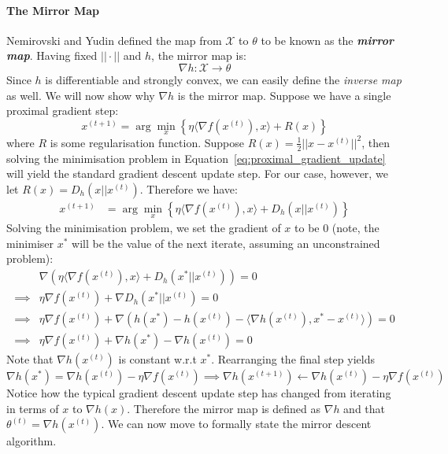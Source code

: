 \paragraph{The Mirror Map}
Nemirovski and Yudin defined the map from $\mathcal X$ to $\theta$ to be known as the \textbf{\textit{mirror map}}. Having fixed $||\cdot||$ and $h$, the mirror map is: \begin{equation}
    \nabla h: \mathcal X \to \theta
\end{equation} Since $h$ is differentiable and strongly convex, we can easily define the \textit{inverse map} as well. We will now show why $\nabla h$ is the mirror map. Suppose we have a single proximal gradient step:
\begin{equation}\label{eq:proximal_gradient_update}
    x^{(t+1)} = \arg \min_{x} \left\{\eta \langle \nabla f(x^{(t)}), x\rangle + R(x)\right\}
\end{equation} where $R$ is some regularisation function. Suppose $R(x) = \frac{1}{2}||x - x^{(t)}||^2$, then solving the minimisation problem in Equation~\ref{eq:proximal_gradient_update} will yield the standard gradient descent update step. For our case, however, we let $R(x) = D_h(x || x^{(t)})$. Therefore we have:
\begin{align}
    x^{(t+1)} &= \arg \min_{x} \left\{\eta \langle \nabla f(x^{(t)}), x\rangle + D_h(x ||x^{(t)})\right\}
\end{align}
Solving the minimisation problem, we set the gradient of $x$ to be 0 (note, the minimiser $x^*$ will be the value of the next iterate, assuming an unconstrained problem):
\begin{align*}
    &\nabla(\eta \langle \nabla f(x^{(t)}), x\rangle + D_h(x^* ||x^{(t)})) = 0\\
    \implies&\eta \nabla f(x^{(t)}) + \nabla D_h(x^*||x^{(t)}) = 0\\
    \implies& \eta \nabla f(x^{(t)}) + \nabla (h(x^*) - h(x^{(t)}) - \langle \nabla h(x^{(t)}), x^* - x^{(t)} \rangle) = 0\\
    \implies&\eta \nabla f(x^{(t)}) + \nabla h(x^*) - \nabla h(x^{(t)}) = 0
\end{align*}Note that $\nabla h(x^{(t)})$ is constant w.r.t $x^*$. Rearranging the final step yields \begin{equation}
    \nabla h(x^*) = \nabla h(x^{(t)}) - \eta \nabla f(x^{(t)}) \implies \boxed{\nabla h(x^{(t+1)}) \gets \nabla h(x^{(t)}) - \eta \nabla f(x^{(t)})}
\end{equation} Notice how the typical gradient descent update step has changed from iterating in terms of $x$ to $\nabla h(x)$. Therefore the mirror map is defined as $\nabla h$ and that $\theta^{(t)} = \nabla h (x^{(t)})$. We can now move to formally state the mirror descent algorithm.

